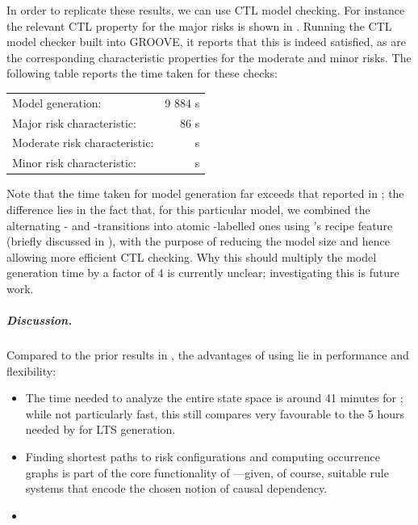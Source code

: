 In order to replicate these results, we can use CTL model checking. For instance the relevant CTL property for the major risks is shown in 
. Running the CTL model checker built into GROOVE, it reports that this is indeed satisfied, as are the corresponding characteristic properties for the moderate and minor risks. The following table reports 
the time taken for these checks:

\begin{center}
\begin{tabular}{lr}
Model generation: & 9 884 s \\
Major risk characteristic: & 86 s \\
Moderate risk characteristic: &  s \\
Minor risk characteristic: &  s \\
\end{tabular}
\end{center}
%
Note that the time taken for model generation far exceeds that reported in ; the difference lies in the fact that, for this particular model, we combined the alternating \contextR- and \reactR-transitions into atomic \fireR-labelled ones using \GROOVE's recipe feature (briefly discussed in ), with the purpose of reducing the model size and hence allowing more efficient CTL checking. Why this should multiply the model generation time by a factor of 4 is currently unclear; investigating this is future work.

\subparagraph*{Discussion.}

Compared to the prior results in \cite{DBLP:conf/cmsb/BowlesBBFGM24}, the advantages of using \GROOVE lie in performance and flexibility:
\begin{itemize}
\item The time needed to analyze the entire state space is around 41 minutes for \GROOVE; while not particularly fast, this still compares very favourable to the 5 hours needed by \BioResolve for LTS generation.

\item Finding shortest paths to risk configurations and computing occurrence graphs is part of the core functionality of \GROOVE---given, of course, suitable rule systems that encode the chosen notion of causal dependency.

\item {}
\end{itemize}
